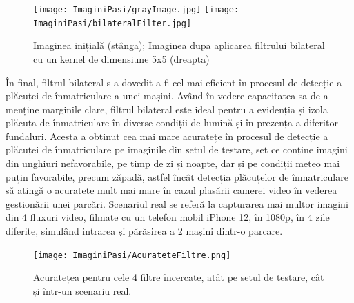 \documentclass[12pt]{article}
\begin{document}
\begin{figure}[H]
  \centering
  \texttt{[image: ImaginiPasi/grayImage.jpg]}\hfill
  \texttt{[image: ImaginiPasi/bilateralFilter.jpg]}
  \caption{Imaginea inițial\u{a} (st\^{a}nga); Imaginea dupa aplicarea filtrului bilateral cu un kernel de dimensiune 5x5 (dreapta)}
  \label{fig:filtrul_bilateral}
\end{figure}

\^{I}n final, filtrul bilateral s-a dovedit a fi cel mai eficient \^{i}n procesul de detecție a pl\u{a}cuței de \^{i}nmatriculare a unei mașini. Av\^{a}nd \^{i}n vedere capacitatea sa de a menține marginile clare, filtrul bilateral este ideal pentru a evidenția și izola pl\u{a}cuța de \^{i}nmatriculare \^{i}n diverse condiții de lumin\u{a} și \^{i}n prezența a diferitor fundaluri. Acesta a obținut cea mai mare acuratețe \^{i}n procesul de detecție a pl\u{a}cuței de \^{i}nmatriculare pe imaginile din setul de testare, set ce conține imagini din unghiuri nefavorabile, pe timp de zi și noapte, dar și pe condiții meteo mai puțin favorabile, precum z\u{a}pad\u{a}, astfel \^{i}nc\^{a}t detecția pl\u{a}cuțelor de \^{i}nmatriculare s\u{a} ating\u{a} o acuratețe mult mai mare \^{i}n cazul plas\u{a}rii camerei video \^{i}n vederea gestion\u{a}rii unei parc\u{a}ri. Scenariul real se refer\u{a} la capturarea mai multor imagini din 4 fluxuri video, filmate cu un telefon mobil iPhone 12, \^{i}n 1080p, \^{i}n 4 zile diferite, simul\^{a}nd intrarea și p\u{a}r\u{a}sirea a 2 mașini dintr-o parcare.

\begin{figure}[H]
  \centering
  \texttt{[image: ImaginiPasi/AcurateteFiltre.png]}
  \caption{Acuratețea pentru cele 4 filtre \^{i}ncercate, at\^{a}t pe setul de testare, c\^{a}t și \^{i}ntr-un scenariu real.}
  \label{fig:comparatie_filtre}
\end{figure}
\end{document}

